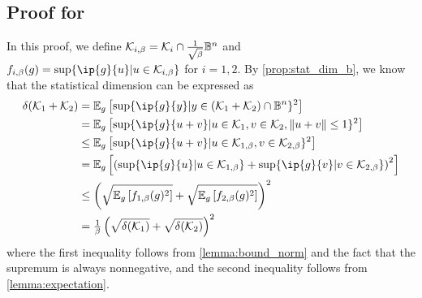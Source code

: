 \subsection{Proof for } \label{sec:proof-bound_sta_dim}
In this proof, we define $\mathcal{K}_{i, \beta} =  \mathcal{K}_i \cap \tfrac{1}{\sqrt{\beta}} \mathbb{B}^n$ and $f_{i, \beta}(g) = \sup\{ \ip{g}{u} | u \in \Kscr_{i, \beta}\}$ for $i = 1, 2$. By \autoref{prop:stat_dim_b}, we know that the statistical dimension can be expressed as
\begin{align*}
  \delta(\Kscr_1 + \Kscr_2) &= \mE_g \left[\sup\{ \ip{g}{y} | y\in(\Kscr_1 + \Kscr_2)\cap\mB^n\}^2 \right]
  \\&= \mE_g \left[\sup\{ \ip{g}{u + v} | u \in \Kscr_1, v \in \Kscr_2, \|u + v\| \leq 1 \}^2\right]
  \\&\leq \mE_g \left[\sup\{ \ip{g}{u + v} | u \in \Kscr_{1, \beta}, v \in \Kscr_{2, \beta} \}^2\right]
  \\&= \mE_g \left[ \left(\sup\{ \ip{g}{u} | u \in \Kscr_{1, \beta}\} + \sup\{ \ip{g}{v} | v \in \Kscr_{2, \beta}\} \right)^2 \right]
  \\&\leq \left( \sqrt{ \mE_g \left[ f_{1, \beta}(g)^2 \right]} + \sqrt{ \mE_g \left[ f_{2, \beta}(g)^2 \right]} \right)^2
  \\&= \tfrac{1}{\beta}\left(\sqrt{\delta(\Kscr_1)} + \sqrt{\delta(\Kscr_2)} \right)^2
\end{align*}
where the first inequality follows from \autoref{lemma:bound_norm} and the fact that the supremum is always nonnegative, and the second inequality follows from \autoref{lemma:expectation}. 

